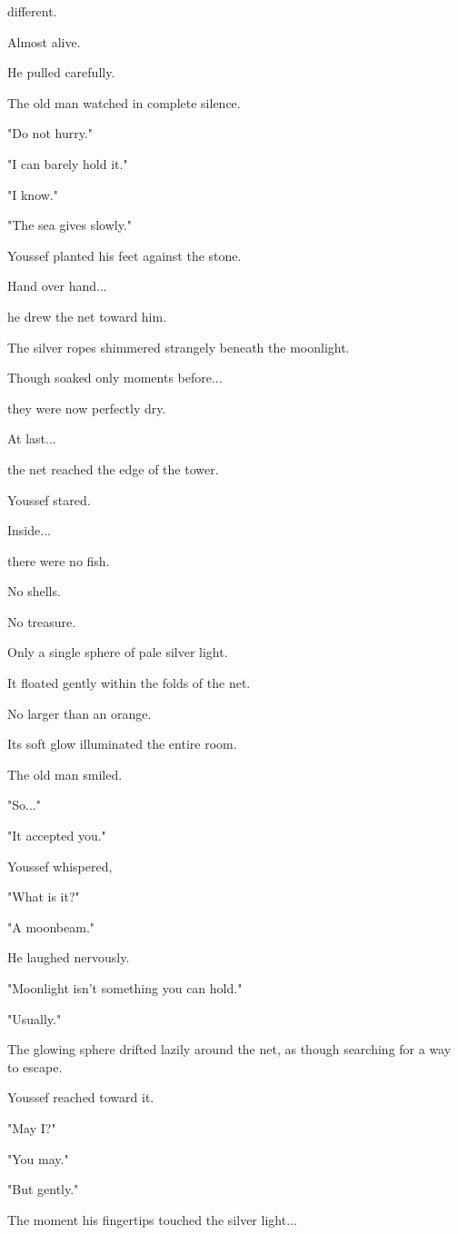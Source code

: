 \documentclass[12pt,openany]{book}
\begin{document}
different.

Almost alive.

He pulled carefully.

The old man watched in complete silence.

"Do not hurry."

"I can barely hold it."

"I know."

"The sea gives slowly."

Youssef planted his feet against the stone.

Hand over hand...

he drew the net toward him.

The silver ropes shimmered strangely beneath the moonlight.

Though soaked only moments before...

they were now perfectly dry.

At last...

the net reached the edge of the tower.

Youssef stared.

Inside...

there were no fish.

No shells.

No treasure.

Only a single sphere of pale silver light.

It floated gently within the folds of the net.

No larger than an orange.

Its soft glow illuminated the entire room.

The old man smiled.

"So..."

"It accepted you."

Youssef whispered,

"What is it?"

"A moonbeam."

He laughed nervously.

"Moonlight isn't something you can hold."

"Usually."

The glowing sphere drifted lazily around the net, as though searching for a way to escape.

Youssef reached toward it.

"May I?"

"You may."

"But gently."

The moment his fingertips touched the silver light...
\end{document}
